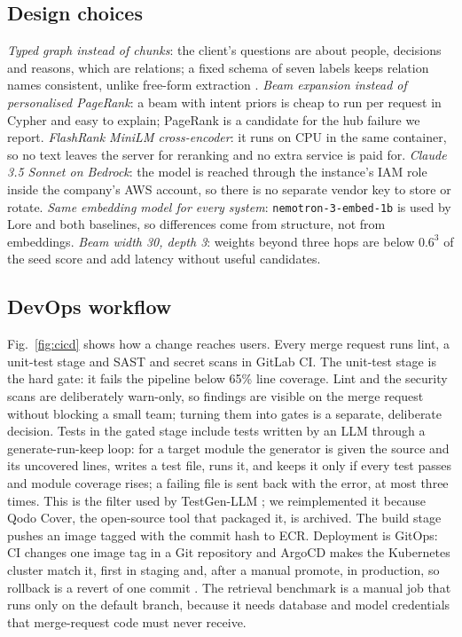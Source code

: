 \documentclass[12pt,onecolumn,draftclsnofoot]{IEEEtran}
\begin{document}
\subsection{Design choices}
\emph{Typed graph instead of chunks}: the client's questions are about people, decisions and reasons, which are relations; a fixed schema of seven labels keeps relation names consistent, unlike free-form extraction \cite{dacruz2025ontology}. \emph{Beam expansion instead of personalised PageRank}: a beam with intent priors is cheap to run per request in Cypher and easy to explain; PageRank \cite{gutierrez2024hipporag} is a candidate for the hub failure we report. \emph{FlashRank MiniLM cross-encoder}: it runs on CPU in the same container, so no text leaves the server for reranking and no extra service is paid for. \emph{Claude 3.5 Sonnet on Bedrock}: the model is reached through the instance's IAM role inside the company's AWS account, so there is no separate vendor key to store or rotate. \emph{Same embedding model for every system}: \texttt{nemotron-3-embed-1b} is used by Lore and both baselines, so differences come from structure, not from embeddings. \emph{Beam width 30, depth 3}: weights beyond three hops are below $0.6^3$ of the seed score and add latency without useful candidates.

\subsection{DevOps workflow}
Fig.~\ref{fig:cicd} shows how a change reaches users. Every merge request runs lint, a unit-test stage and SAST and secret scans in GitLab CI. The unit-test stage is the hard gate: it fails the pipeline below 65\% line coverage. Lint and the security scans are deliberately warn-only, so findings are visible on the merge request without blocking a small team; turning them into gates is a separate, deliberate decision. Tests in the gated stage include tests written by an LLM through a generate-run-keep loop: for a target module the generator is given the source and its uncovered lines, writes a test file, runs it, and keeps it only if every test passes and module coverage rises; a failing file is sent back with the error, at most three times. This is the filter used by TestGen-LLM \cite{alshahwan2024testgen}; we reimplemented it because Qodo Cover, the open-source tool that packaged it, is archived. The build stage pushes an image tagged with the commit hash to ECR. Deployment is GitOps: CI changes one image tag in a Git repository and ArgoCD makes the Kubernetes cluster match it, first in staging and, after a manual promote, in production, so rollback is a revert of one commit \cite{humble2010cd}. The retrieval benchmark is a manual job that runs only on the default branch, because it needs database and model credentials that merge-request code must never receive.
\end{document}

